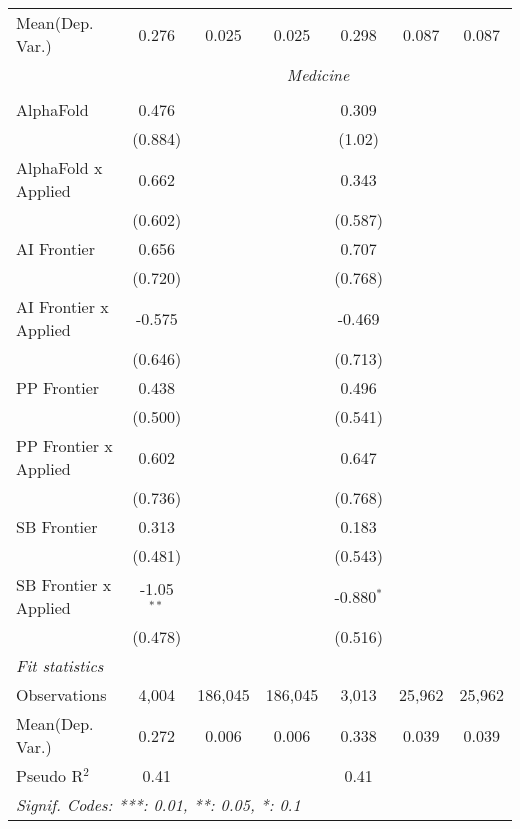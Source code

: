 \begin{tabular}{lcccccc}
Mean(Dep. Var.) & 0.276 & 0.025 & 0.025 & 0.298 & 0.087 & 0.087 \\
 & \multicolumn{6}{c}{\textit{Medicine}} \\ \\
   AlphaFold             & 0.476        &         &         & 0.309        &        &   \\   
                         & (0.884)      &         &         & (1.02)       &        &   \\   
   AlphaFold x Applied   & 0.662        &         &         & 0.343        &        &   \\   
                         & (0.602)      &         &         & (0.587)      &        &   \\   
   AI Frontier           & 0.656        &         &         & 0.707        &        &   \\   
                         & (0.720)      &         &         & (0.768)      &        &   \\   
   AI Frontier x Applied & -0.575       &         &         & -0.469       &        &   \\   
                         & (0.646)      &         &         & (0.713)      &        &   \\   
   PP Frontier           & 0.438        &         &         & 0.496        &        &   \\   
                         & (0.500)      &         &         & (0.541)      &        &   \\   
   PP Frontier x Applied & 0.602        &         &         & 0.647        &        &   \\   
                         & (0.736)      &         &         & (0.768)      &        &   \\   
   SB Frontier           & 0.313        &         &         & 0.183        &        &   \\   
                         & (0.481)      &         &         & (0.543)      &        &   \\   
   SB Frontier x Applied & -1.05$^{**}$ &         &         & -0.880$^{*}$ &        &   \\   
                         & (0.478)      &         &         & (0.516)      &        &   \\   
   \midrule
   \emph{Fit statistics}\\
   Observations          & 4,004        & 186,045 & 186,045 & 3,013        & 25,962 & 25,962\\  
Mean(Dep. Var.) & 0.272 & 0.006 & 0.006 & 0.338 & 0.039 & 0.039 \\
   Pseudo R$^2$          & 0.41         &         &         & 0.41         &        & \\  
   \midrule \midrule
   \multicolumn{7}{l}{\emph{Signif. Codes: ***: 0.01, **: 0.05, *: 0.1}}\\
\end{tabular}
\par\endgroup
